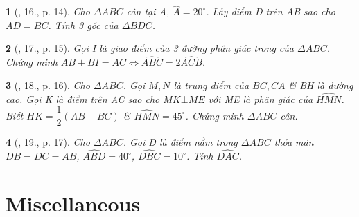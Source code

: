 \documentclass{article}
\newtheorem{baitoan}{}%
\begin{document}
\begin{baitoan}[\cite{Dang2018}, 16., p. 14]
	Cho $\Delta ABC$ cân tại A, $ \widehat{A} = 20^\circ$. Lấy điểm D trên AB sao cho $AD = BC$. Tính 3 góc của $\Delta BDC$.
\end{baitoan}

\begin{baitoan}[\cite{Dang2018}, 17., p. 15]
	Gọi I là giao điểm của 3 đường phân giác trong của $\Delta ABC$. Chứng minh $AB + BI = AC\Leftrightarrow\widehat{ABC} = 2\widehat{ACB}$.
\end{baitoan}

\begin{baitoan}[\cite{Dang2018}, 18., p. 16]
	Cho $\Delta ABC$. Gọi $M,N$ là trung điểm của $BC,CA$ \& BH là đường cao. Gọi K là điểm trên AC sao cho $MK\bot ME$ với ME là phân giác của $\widehat{HMN}$. Biết $HK = \dfrac{1}{2}(AB + BC)$ \& $\widehat{HMN} = 45^\circ$. Chứng minh $\Delta ABC$ cân.
\end{baitoan}

\begin{baitoan}[\cite{Dang2018}, 19., p. 17]
	Cho $\Delta ABC$. Gọi D là điểm nằm trong $\Delta ABC$ thỏa mãn $DB = DC = AB$, $\widehat{ABD} = 40^\circ$, $\widehat{DBC} = 10^\circ$. Tính $\widehat{DAC}$.
\end{baitoan}


\section{Miscellaneous}




\printbibliography[heading=bibintoc]
\end{document}
